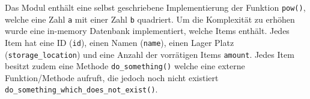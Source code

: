 Das Modul enthält eine selbst geschriebene Implementierung der Funktion \lstinline|pow()|,
welche eine Zahl \lstinline|a| mit einer Zahl \lstinline|b| quadriert. Um die Komplexität
zu erhöhen wurde eine in-memory Datenbank implementiert, welche Items enthält. Jedes Item 
hat eine ID (\lstinline|id|), einen Namen (\lstinline|name|), einen Lager Platz
(\lstinline|storage_location|) und eine Anzahl der vorrätigen Items \lstinline|amount|.
Jedes Item besitzt zudem eine Methode \lstinline|do_something()| welche eine externe
Funktion/Methode aufruft, die jedoch noch nicht existiert
\lstinline|do_something_which_does_not_exist()|.




